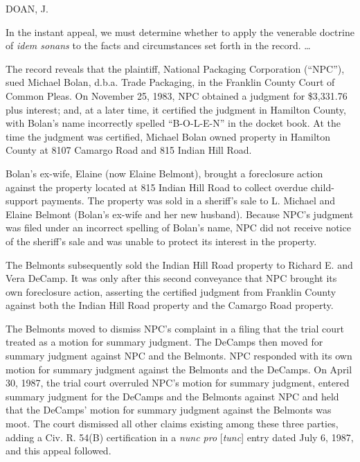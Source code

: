 
DOAN, J.

In the instant appeal, we must determine whether to apply the venerable doctrine
of \textit{idem sonans} to the facts and circumstances set forth in the record.
\dots{}

The record reveals that the plaintiff, National Packaging Corporation (``NPC''),
sued Michael Bolan, d.b.a. Trade Packaging, in the Franklin County Court of
Common Pleas. On November 25, 1983, NPC obtained a judgment for \$3,331.76 plus
interest; and, at a later time, it certified the judgment in Hamilton County,
with Bolan's name incorrectly spelled ``B-O-L-E-N'' in the docket book. At the
time the judgment was certified, Michael Bolan owned property in Hamilton
County at 8107 Camargo Road and 815 Indian Hill Road.

Bolan's ex-wife, Elaine (now Elaine Belmont), brought a foreclosure action
against the property located at 815 Indian Hill Road to collect overdue
child-support payments. The property was sold in a sheriff's sale to L. Michael
and Elaine Belmont (Bolan's ex-wife and her new husband). Because NPC's
judgment was filed under an incorrect spelling of Bolan's name, NPC did not
receive notice of the sheriff's sale and was unable to protect its interest in
the property.

The Belmonts subsequently sold the Indian Hill Road property to Richard E. and
Vera DeCamp. It was only after this second conveyance that NPC brought its own
foreclosure action, asserting the certified judgment from Franklin County
against both the Indian Hill Road property and the Camargo Road property.

The Belmonts moved to dismiss NPC's complaint in a filing that the trial court
treated as a motion for summary judgment. The DeCamps then moved for summary
judgment against NPC and the Belmonts. NPC responded with its own motion for
summary judgment against the Belmonts and the DeCamps. On April 30, 1987, the
trial court overruled NPC's motion for summary judgment, entered summary
judgment for the DeCamps and the Belmonts against NPC and held that the
DeCamps' motion for summary judgment against the Belmonts was moot. The court
dismissed all other claims existing among these three parties, adding a Civ. R.
54(B) certification in a \textit{nunc pro }[\textit{tunc}] entry dated July 6,
1987, and this appeal followed.

